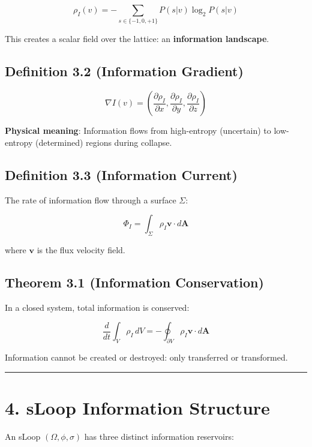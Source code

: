 \documentclass[
  11pt,
  letterpaper,
  twoside,
  openany]{book}
\makeatletter
\let\orig@section\section
\renewcommand{\section}{\needspace{8\baselineskip}\orig@section}
\let\orig@subsection\subsection
\renewcommand{\subsection}{\needspace{6\baselineskip}\orig@subsection}
\makeatother
\begin{document}
\[\rho_I(v) = -\sum_{s \in \{-1,0,+1\}} P(s|v) \log_2 P(s|v)\]

This creates a scalar field over the lattice: an \textbf{information
landscape}.

\subsection{Definition 3.2 (Information
Gradient)}\label{definition-3.2-information-gradient}

\[\nabla I(v) = \left(\frac{\partial \rho_I}{\partial x}, \frac{\partial \rho_I}{\partial y}, \frac{\partial \rho_I}{\partial z}\right)\]

\textbf{Physical meaning}: Information flows from high-entropy
(uncertain) to low-entropy (determined) regions during collapse.

\subsection{Definition 3.3 (Information
Current)}\label{definition-3.3-information-current}

The rate of information flow through a surface \(\Sigma\):

\[\Phi_I = \int_\Sigma \rho_I \mathbf{v} \cdot d\mathbf{A}\]

where \(\mathbf{v}\) is the flux velocity field.

\subsection{Theorem 3.1 (Information
Conservation)}\label{theorem-3.1-information-conservation}

In a closed system, total information is conserved:

\[\frac{d}{dt} \int_V \rho_I \, dV = -\oint_{\partial V} \rho_I \mathbf{v} \cdot d\mathbf{A}\]

Information cannot be created or destroyed: only transferred or
transformed.

\begin{center}\rule{0.5\linewidth}{0.5pt}\end{center}

\section{4. sLoop Information
Structure}\label{sloop-information-structure}

An sLoop \((\Omega, \phi, \sigma)\) has three distinct information
reservoirs:
\end{document}
